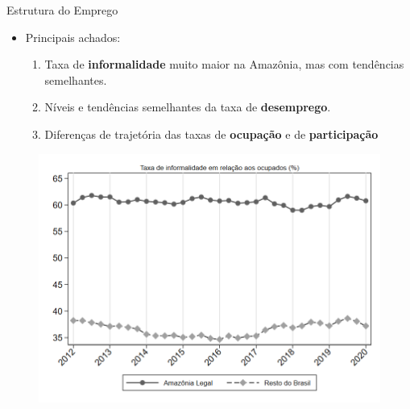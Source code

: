 \documentclass[11pt]{beamer}
\begin{document}
\begin{frame}
\centering
{\huge Estrutura do Emprego}

\vspace{4mm}
\begin{itemize}
	\item{Principais achados:
	\vspace{3mm}
	\begin{enumerate}
		\item{Taxa de \textbf{informalidade} muito maior na Amazônia, mas com tendências semelhantes.}
		\vspace{1mm}
		\item{Níveis e tendências semelhantes da taxa de \textbf{desemprego}.}
		\vspace{1mm}
		\item{Diferenças de trajetória das taxas de \textbf{ocupação} e de \textbf{participação}}
	\end{enumerate}
	}
\end{itemize}


\end{frame}

\begin{frame}[label=_estrutura_emprego_taxa_de_informalidade]{}
\begin{figure}
  \centering
  \includegraphics[width=1\linewidth]{../../analysis/output/estrutura_emprego/_estrutura_emprego_taxa_de_informalidade.png}
  \caption{}
  \label{fig:_estrutura_emprego_taxa_de_informalidade}
\end{figure}
\end{frame}
\end{document}
